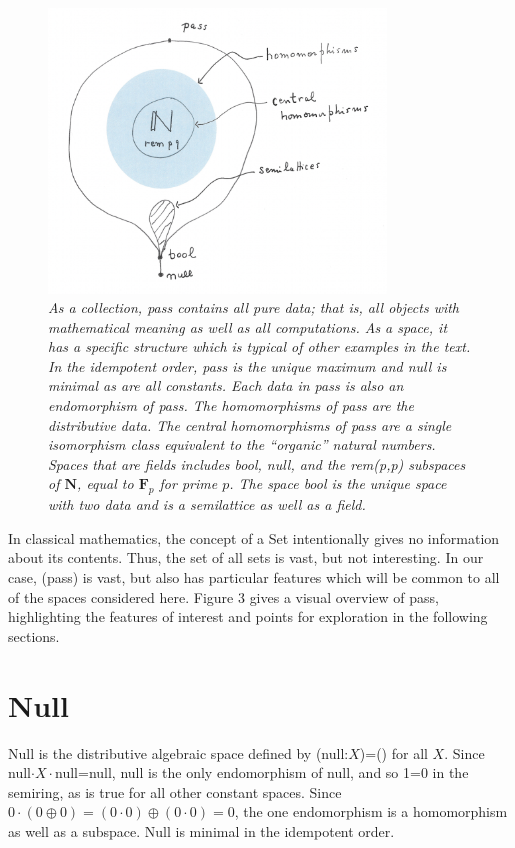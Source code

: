\documentclass[11pt]{article}
\begin{document}
\begin{figure}[h]
\centering
\includegraphics[width=0.8\textwidth]{pass.png}
\caption{{\it As a collection, pass contains all pure data; that is, all objects with mathematical 
meaning as well as all computations.  As a space, it has a specific structure which is typical of other examples in the text.  
In the idempotent order, pass is the unique maximum and null is minimal as are all constants.  
Each data in pass is also an endomorphism of pass.  The homomorphisms of pass are the distributive data.  
The central homomorphisms of pass are a single isomorphism class equivalent to the ``organic'' natural 
numbers.  Spaces that are fields includes bool, null, and the rem(p,p) subspaces of ${\mathbf N}$, equal to ${\mathbf F}_p$ for prime $p$. 
The space bool is the unique space with two data and is a semilattice as well as a field.}}
\end{figure}

In classical mathematics, the concept of a Set intentionally gives no information about its contents.  Thus, the set of all sets is vast, but 
not interesting.  In our case, (pass) is vast, but also has particular features which will be common to all of the spaces considered here. 
Figure 3 gives a visual overview of pass, highlighting the features of interest and points for exploration in the following sections. 

\section{Null}

    Null is the distributive algebraic space defined by (null:$X$)=() for all $X$.  Since null$\cdot X\cdot$null=null, null is the only endomorphism 
of null, and so 1=0 in the semiring, as is true for all other constant spaces.  Since $0\cdot(0\oplus 0)=(0\cdot 0) \oplus (0\cdot 0)=0$, the one 
endomorphism is a homomorphism as well as a subspace.   Null is minimal in the idempotent order. 
\end{document}
